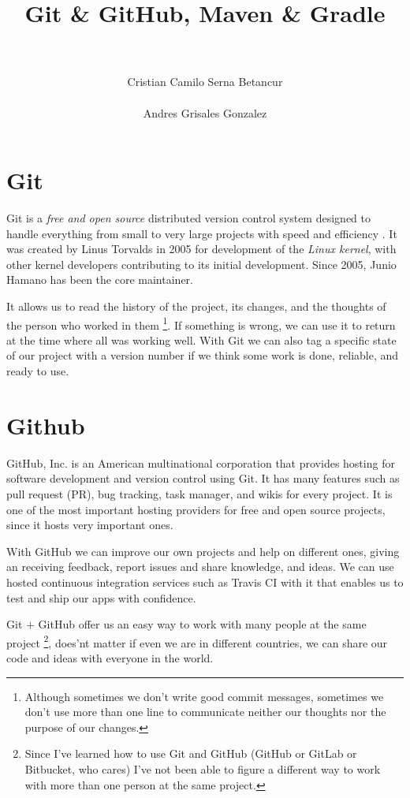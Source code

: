 \documentclass[a4paper,11pt]{article}
\title{Git \& GitHub, Maven \& Gradle}
\author{\\\\ Cristian Camilo Serna Betancur \\\\ Andres Grisales Gonzalez}
\begin{document}
\maketitle
\tableofcontents

\section{Git}
Git is a \emph{free and open source} distributed version control system designed 
to handle everything from small to very large projects with speed and efficiency
\cite{GIT:1}. It was created by Linus Torvalds in 2005 for development of the 
\emph{Linux kernel}, with other kernel developers contributing to its initial 
development. Since 2005, Junio Hamano has been the core maintainer\cite{GIT:2}.

It allows us to read the history of the project, its changes, and the thoughts 
of the person who worked in them \footnote{Although sometimes we don't write 
good commit messages, sometimes we don't use more than one line to communicate 
neither our thoughts nor the purpose of our changes.}. If something is wrong, 
we can use it to return at the time where all was working well. With Git we can 
also tag a specific state of our project with a version number if we think some 
work is done, reliable, and ready to use.

\section{Github}
GitHub, Inc. is an American multinational corporation that provides hosting for 
software development and version control using Git\cite{GITHUB:1}. It has many 
features such as pull request (PR), bug tracking, task manager, and wikis for 
every project. It is one of the most important hosting providers for free and 
open source projects, since it hosts very important ones.

With GitHub we can improve our own projects and help on different ones, giving 
an receiving feedback, report issues and share knowledge, and ideas. We can use
hosted continuous integration services such as Travis CI with it that enables us
to test and ship our apps with confidence\cite{TRAVIS:1}.

Git $+$ GitHub offer us an easy way to work with many people at the same project
\footnote{Since I've learned how to use Git and GitHub (GitHub or GitLab or 
Bitbucket, who cares) I've not been able to figure a different way to work with 
more than one person at the same project.}, does'nt matter if even we are in 
different countries, we can share our code and ideas with everyone in the world.
\end{document}
